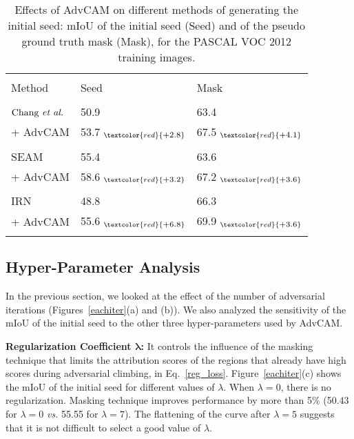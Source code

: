 \documentclass[final]{cvpr}
\begin{document}
\begin{table}[tbp]
\renewcommand{\arraystretch}{0.92}
  \centering
  \caption{Effects of AdvCAM on different methods of generating the initial seed: mIoU of the initial seed (Seed) and of the pseudo ground truth mask (Mask), for the PASCAL VOC 2012 training images.}
  \vspace{-0.7em}
    \begin{tabular}{l@{\hskip 0.25in}l@{\hskip 0.25in}l}
     \Xhline{1pt}\\[-0.95em]
    Method  & Seed  & Mask \\
    \hline\hline \\[-0.9em]
    $\text{Chang \textit{et al.}}$~\cite{chang2020weakly} & 50.9 & 63.4 \\
    + AdvCAM  &53.7$_{~\textcolor{red}{\scaleto{+2.8}{6pt}}}$ & 67.5$_{~\textcolor{red}{\scaleto{+4.1}{6pt}}}$  \\
    \hline \\[-0.9em]
    $\text{SEAM}$~\cite{wang2020self} & 55.4  & 63.6  \\
    + AdvCAM  & 58.6$_{~\textcolor{red}{\scaleto{+3.2}{6pt}}}$ & 67.2$_{~\textcolor{red}{\scaleto{+3.6}{6pt}}}$   \\
    \hline \\[-0.9em]
    $\text{IRN}$~\cite{ahn2018learning} & 48.8  & 66.3  \\
    + AdvCAM  & 55.6$_{~\textcolor{red}{\scaleto{+6.8}{6pt}}}$  & 69.9$_{~\textcolor{red}{\scaleto{+3.6}{6pt}}}$   \\
\Xhline{1pt}
    \vspace{-1.5em}
    \end{tabular}\label{tab:baselines}\end{table}


%
 
\subsection{Hyper-Parameter Analysis}\label{hyperparam}
In the previous section, we looked at the effect of the number of adversarial iterations (Figures~\ref{eachiter}(a) and (b)).
We also analyzed the sensitivity of the mIoU of the initial seed to the other three hyper-parameters used by AdvCAM. 


\textbf{Regularization Coefficient $\boldsymbol{\lambda}$:} It controls the influence of the masking technique that limits the attribution scores of the regions that already have high scores during adversarial climbing, in Eq.~\ref{reg_loss}.
Figure~\ref{eachiter}(c) shows the mIoU of the initial seed for different values of $\lambda$. When $\lambda=0$, there is no regularization.
Masking technique improves performance by more than 5\% (50.43 for $\lambda=0$ \textit{vs.} 55.55 for $\lambda=7$).
The flattening of the curve after $\lambda=5$ suggests that it is not difficult to select a good value of $\lambda$.
\end{document}

